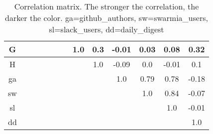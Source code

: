 \begin{table}[h]
\begin{tabular}{ccccccccccccc}
G &  &  &  &  &  &  & \textcolor{cor-very-strong}{1.0} & \textcolor{cor-weak}{0.3} & \textcolor{cor-very-weak}{-0.01} & \textcolor{cor-very-weak}{0.03} & \textcolor{cor-very-weak}{0.08} & \textcolor{cor-weak}{0.32}\\ \hline
H &  &  &  &  &  &  &  & \textcolor{cor-very-strong}{1.0} & \textcolor{cor-very-weak}{-0.09} & \textcolor{cor-very-weak}{0.0} & \textcolor{cor-very-weak}{-0.01} & \textcolor{cor-very-weak}{0.1}\\ \hline
ga &  &  &  &  &  &  &  &  & \textcolor{cor-very-strong}{1.0} & \textcolor{cor-strong}{0.79} & \textcolor{cor-strong}{0.78} & \textcolor{cor-very-weak}{-0.18}\\ \hline
sw &  &  &  &  &  &  &  &  &  & \textcolor{cor-very-strong}{1.0} & \textcolor{cor-very-strong}{0.84} & \textcolor{cor-very-weak}{-0.07}\\ \hline
sl &  &  &  &  &  &  &  &  &  &  & \textcolor{cor-very-strong}{1.0} & \textcolor{cor-very-weak}{-0.01}\\ \hline
dd &  &  &  &  &  &  &  &  &  &  &  & \textcolor{cor-very-strong}{1.0}\\ \hline

\end{tabular}
\caption{Correlation matrix. The stronger the correlation, the darker the color. ga=github\_authors, sw=swarmia\_users, sl=slack\_users, dd=daily\_digest}
\label{tab:correlationMatrix}
\end{table}